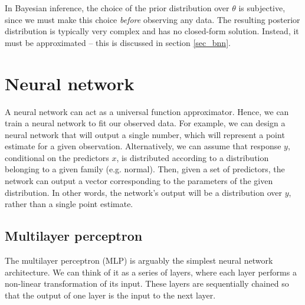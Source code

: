 \documentclass[12pt]{article}
\begin{document}
In Bayesian inference, the choice of the prior distribution over $\theta$ is subjective, since we must make this choice \textit{before} observing any data. The resulting posterior distribution is typically very complex and has no closed-form solution. Instead, it must be approximated -- this is discussed in section \ref{sec_bnn}.

\section{Neural network}

A neural network can act as a universal function approximator. Hence, we can train a neural network to fit our observed data. For example, we can design a neural network that will output a single number, which will represent a point estimate for a given observation. Alternatively, we can assume that response $y$, conditional on the predictors $x$, is distributed according to a distribution belonging to a given family (e.g. normal). Then, given a set of predictors, the network can output a vector corresponding to the parameters of the given distribution. In other words, the network's output will be a distribution over $y$, rather than a single point estimate. 

\subsection{Multilayer perceptron}

The multilayer perceptron (MLP) is arguably the simplest neural network architecture. We can think of it as a series of layers, where each layer performs a non-linear transformation of its input. These layers are sequentially chained so that the output of one layer is the input to the next layer.
\end{document}
